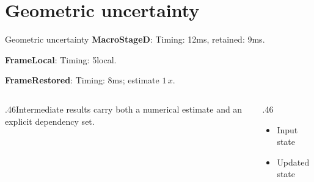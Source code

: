 \documentclass[12pt,aspectratio=43]{beamer}
\newcommand{\fuzzlayerA}[1]{\textbf{#1}}
\newcommand{\fuzzterm}[1]{\fuzzlayerA{#1}}
\newcommand{\fuzzpair}[2]{\fuzzterm{#1}: #2}
\newcommand{\fuzzunit}{ms}
\let\fuzzoriginalunit\fuzzunit
\newcommand{\fuzzcoefficient}{1}
\newcommand{\fuzzscale}[2][\fuzzcoefficient]{#1\,#2}
\begin{document}
\section{Geometric uncertainty}
\begin{frame}[t]{Geometric uncertainty}
\fuzzpair{MacroStageD}{Timing: 12\fuzzunit, retained: 9\fuzzoriginalunit.}\par
{\renewcommand{\fuzzunit}{local}\fuzzpair{FrameLocal}{Timing: 5\fuzzunit.}\par}
\fuzzpair{FrameRestored}{Timing: 8\fuzzunit; estimate $\fuzzscale{x}$.}\par
\begin{columns}[T]\begin{column}{.46\textwidth}Intermediate results carry both a numerical estimate and an explicit dependency set.\end{column}\begin{column}{.46\textwidth}\begin{itemize}\item Input state\item Updated state\end{itemize}\end{column}\end{columns}
\end{frame}
\end{document}
